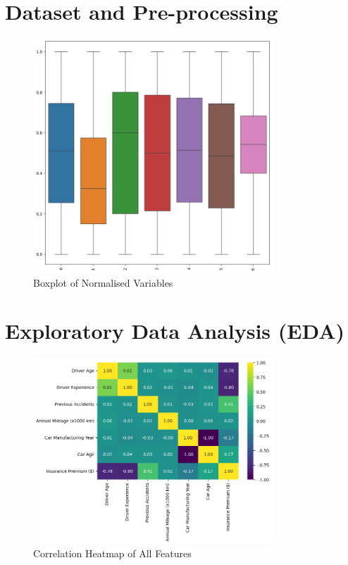 \documentclass{article}
\begin{document}
\newpage
\section{Dataset and Pre-processing}

\begin{figure}[h]
\centering
\includegraphics[width=0.8\textwidth]{boxplot.png}
\caption{Boxplot of Normalised Variables}
\label{fig:boxplot}
\end{figure}

\newpage
\section{Exploratory Data Analysis (EDA)}

\begin{figure}[h]
\centering
\includegraphics[width=0.8\textwidth]{heatmap.png}
\caption{Correlation Heatmap of All Features}
\label{fig:heatmap}
\end{figure}
\end{document}
